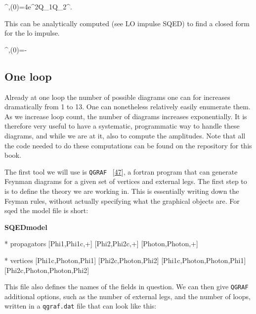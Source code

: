 \documentclass[
  10pt,
  a4paper,
  DIV=11,
  numbers=noendperiod,
  oneside]{scrreprt}
\newenvironment{Shaded}{\begin{snugshade}}{\end{snugshade}}
\newcommand{\NormalTok}[1]{\textcolor[rgb]{0.00,0.23,0.31}{#1}}
\let\[\relax \let\]\relax %
\DeclareRobustCommand{\[}{\begin{equation}}
\DeclareRobustCommand{\]}{\end{equation}}
\begin{document}
\[
\Delta \emom[1]^{\mu,(0)}=4e^2Q_1Q_2\mass[1]\mass[2]\relfact\int\dn[4]{\tw}\tw^\mu {}.
\]

This can be analytically computed (see LO impulse SQED) to find a closed
form for the \gls{lo} impulse.

\[
\Delta \emom[1]^{\mu,(0)}=-  
\]

\hypertarget{one-loop}{%
\subsection{One loop}\label{one-loop}}

Already at one loop the number of possible diagrams one can for
increases dramatically from 1 to 13. One can nonetheless relatively
easily enumerate them. As we increase loop count, the number of diagrams
increases exponentially. It is therefore very useful to have a
systematic, programmatic way to handle these diagrams, and while we are
at it, also to compute the amplitudes. Note that all the code needed to
do these computations can be found on the repository for this book.

The first tool we will use is \texttt{QGRAF}
~{[}\protect\hyperlink{ref-Nogueira:1993a}{47}{]}, a fortran program
that can generate Feynman diagrams for a given set of vertices and
external legs. The first step to is to define the theory we are working
in. This is essentially writing down the Feyman rules, without actually
specifying what the graphical objects are. For \gls{sqed} the model file
is short:

\textbf{SQEDmodel}

\begin{Shaded}
\begin{Highlighting}[]
\NormalTok{* propagators}
\NormalTok{ [Phi1,Phi1c,+]}
\NormalTok{ [Phi2,Phi2c,+]}
\NormalTok{ [Photon,Photon,+]}

\NormalTok{* vertices}
\NormalTok{ [Phi1c,Photon,Phi1]}
\NormalTok{ [Phi2c,Photon,Phi2]}
\NormalTok{ [Phi1c,Photon,Photon,Phi1]}
\NormalTok{ [Phi2c,Photon,Photon,Phi2]}
\end{Highlighting}
\end{Shaded}

This file also defines the names of the fields in question. We can then
give \texttt{QGRAF} additional options, such as the number of external
legs, and the number of loops, written in a \texttt{qgraf.dat} file that
can look like this:
\end{document}
